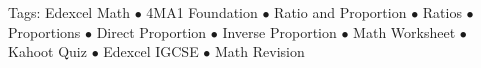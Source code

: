 \documentclass[11pt,a4paper]{article}
\begin{document}
\vspace{14pt}
\begin{center}
  \sffamily\scriptsize\textcolor{textmuted}{
    Tags: Edexcel Math $\bullet$ 4MA1 Foundation $\bullet$ Ratio and Proportion $\bullet$ Ratios $\bullet$ Proportions $\bullet$ Direct Proportion $\bullet$ Inverse Proportion $\bullet$ Math Worksheet $\bullet$ Kahoot Quiz $\bullet$ Edexcel IGCSE $\bullet$ Math Revision
  }
\end{center}
\end{document}
